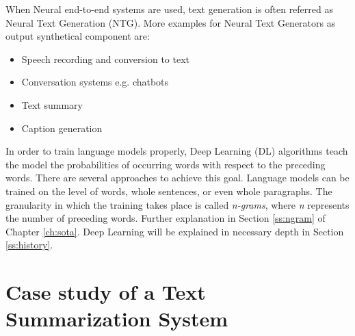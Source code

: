 When Neural end-to-end systems are used, text generation is often referred as Neural Text Generation (NTG). More examples for Neural Text Generators as output synthetical component are:

\begin{itemize}
\item Speech recording and conversion to text
\item Conversation systems e.g. chatbots
\item Text summary
\item Caption generation
\end{itemize} 


In order to train language models properly, Deep Learning (DL) algorithms teach the model the probabilities of occurring words with respect to the preceding words. There are several approaches to achieve this goal. Language models can be trained on the level of words, whole sentences, or even whole paragraphs. The granularity in which the training takes place is called \textit{n-grams}, where \textit{n} represents the number of preceding words. Further explanation in Section \ref{ss:ngram} of Chapter \ref{ch:sota}. Deep Learning will be explained in necessary depth in Section \ref{ss:history}.



\section{Case study of a Text Summarization System}







